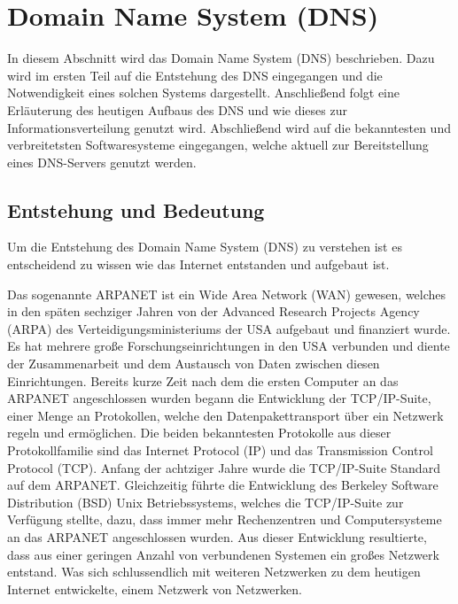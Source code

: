 \documentclass[a4paper, 12pt, BCOR10mm, DIV12, toc=bibliography, toc=listof, german]{scrbook}
\def \dns {Domain Name System (DNS)}
\begin{document}
		\section{Domain Name System (DNS)} %
		\label{sec:dns}

		In diesem Abschnitt wird das \dns{} \cite{rfc1034,rfc1035} beschrieben. Dazu wird im ersten Teil
		auf die Entstehung des DNS eingegangen und die Notwendigkeit eines solchen Systems dargestellt.
		Anschließend folgt eine Erläuterung des heutigen Aufbaus des DNS und wie dieses zur
		Informationsverteilung genutzt wird.  Abschließend wird auf die bekanntesten und verbreitetsten
		Softwaresysteme eingegangen, welche aktuell zur Bereitstellung eines DNS-Servers genutzt werden.

			\subsection{Entstehung und Bedeutung} %
			\label{sub:entstehung}

			Um die Entstehung des \dns{} zu verstehen ist es entscheidend zu wissen wie das Internet
			entstanden und aufgebaut ist.
			
			Das sogenannte ARPANET ist ein Wide Area Network (WAN) gewesen, welches in den späten
			sechziger Jahren von der Advanced Research Projects Agency (ARPA) des
			Verteidigungsministeriums der USA aufgebaut und finanziert wurde. Es hat mehrere große
			Forschungseinrichtungen in den USA verbunden und diente der Zusammenarbeit und dem Austausch
			von Daten zwischen diesen Einrichtungen. Bereits kurze Zeit nach dem die ersten Computer an
			das ARPANET angeschlossen wurden begann die Entwicklung der TCP/IP-Suite, einer Menge an
			Protokollen, welche den Datenpakettransport über ein Netzwerk regeln und ermöglichen.  Die
			beiden bekanntesten Protokolle aus dieser Protokollfamilie sind das Internet Protocol (IP) und
			das Transmission Control Protocol (TCP). Anfang der achtziger Jahre wurde die TCP/IP-Suite
			Standard auf dem ARPANET. Gleichzeitig führte die Entwicklung des Berkeley Software
			Distribution (BSD) Unix Betriebssystems, welches die TCP/IP-Suite zur Verfügung stellte, dazu,
			dass immer mehr Rechenzentren und Computersysteme an das ARPANET angeschlossen wurden. Aus
			dieser Entwicklung resultierte, dass aus einer geringen Anzahl von verbundenen Systemen ein
			großes Netzwerk entstand. Was sich schlussendlich mit weiteren Netzwerken zu dem heutigen
			Internet entwickelte, einem Netzwerk von Netzwerken.
\end{document}
